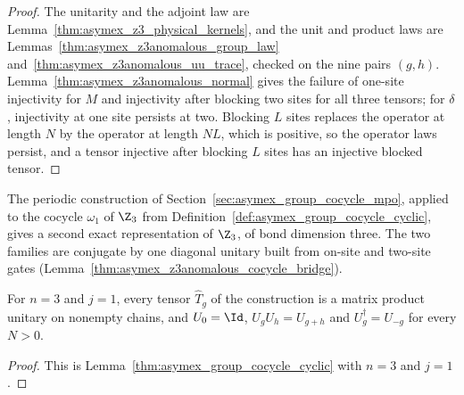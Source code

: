 \begin{proof}
    \leanok
    The unitarity and the adjoint law are
    Lemma~\ref{thm:asymex_z3_physical_kernels}, and the unit and product
    laws are Lemmas~\ref{thm:asymex_z3anomalous_group_law}
    and~\ref{thm:asymex_z3anomalous_uu_trace}, checked on the nine pairs
    $(g,h)$. Lemma~\ref{thm:asymex_z3anomalous_normal} gives the failure
    of one-site injectivity for $M$ and injectivity after blocking two sites
    for all three tensors; for $\delta$, injectivity at one site persists
    at two. Blocking $L$ sites replaces the operator at length $N$ by the
    operator at length $NL$, which is positive, so the operator laws
    persist, and a tensor injective after blocking $L$ sites has an
    injective blocked tensor.
\end{proof}

The periodic construction of Section~\ref{sec:asymex_group_cocycle_mpo},
applied to the cocycle $\omega_1$ of $\Z_3$ from
Definition~\ref{def:asymex_group_cocycle_cyclic}, gives a second exact
representation of $\Z_3$, of bond dimension three. The two families are
conjugate by one diagonal unitary built from on-site and two-site gates
(Lemma~\ref{thm:asymex_z3anomalous_cocycle_bridge}).

\begin{lemma}
    \label{thm:asymex_z3anomalous_cocycle_family}
    \leanok
    For $n=3$ and $j=1$, every tensor $\hat T_g$ of the construction is a
    matrix product unitary on nonempty chains, and $U_0=\Id$,
    $U_gU_h=U_{g+h}$ and $U_g^\dagger=U_{-g}$ for every $N>0$.
\end{lemma}

\begin{proof}
    \leanok
    This is Lemma~\ref{thm:asymex_group_cocycle_cyclic} with $n=3$ and
    $j=1$.
\end{proof}

